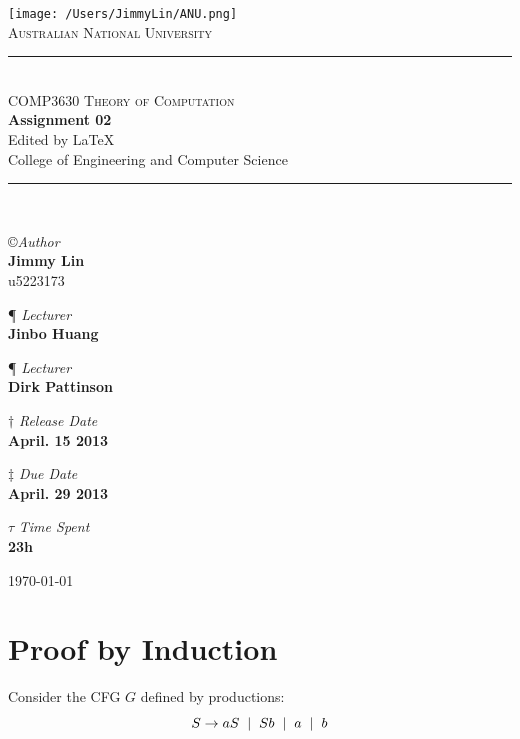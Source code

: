 \documentclass[11pt,a4paper]{article}
\newcommand{\AUTHOR}{Jimmy Lin}
\newcommand{\UID}{u5223173}
\newcommand{\UNIVERSITY}{Australian National University}
\newcommand{\COLLEGE}{College of Engineering and Computer Science}
\newcommand{\COURSE}{COMP3630 Theory of Computation}
\newcommand{\LECTURER}{Jinbo Huang}
\newcommand{\LECTURERt}{Dirk Pattinson}
\newcommand{\TASK}{Assignment 02}
\newcommand{\RELEASEDATE}{April. 15 2013}
\newcommand{\DUEDATE}{April. 29 2013}
\newcommand{\TIMECONSUME}{23h}
\newcommand{\htab}{\hspace*{0.63cm}}
\newcommand{\ba}{\hspace*{0.2cm} | \hspace*{0.2cm}}
\begin{document}
\begin{titlepage}
    \begin{center}
        \vspace*{0.8cm}
\texttt{[image: /Users/JimmyLin/ANU.png]}\\[1cm]
\textsc{\LARGE \UNIVERSITY}\\[1.5cm]

\rule{\linewidth}{0.5mm} \\[0.4cm]
{ \textsc{\Large \COURSE}\\[0.5cm]
 \huge \bfseries \TASK}\\[0.4cm]
 \footnotesize Edited by \LaTeX \\[0.25cm]
 \normalsize{\COLLEGE}
\rule{\linewidth}{0.5mm} \\[1.5cm]

\begin{center}
\copyright \emph{\large Author} \\
\Large \textbf{\AUTHOR} \\ \UID \vspace*{0.6cm}

\P \emph{ Lecturer} \\
\Large \textbf{\LECTURER} \vspace*{0.6cm}

\P \emph{ Lecturer} \\
\Large \textbf{\LECTURERt} \vspace*{0.6cm}


$\dagger$ \emph{Release Date}  \\
\Large \textbf{\RELEASEDATE} \vspace*{0.6cm} 

$\ddagger$ \emph{Due Date}  \\
\Large \textbf{\DUEDATE} \vspace*{0.6cm}

$\tau$ \emph{Time Spent} \\
\Large \textbf{\TIMECONSUME} \vspace*{0.6cm} 
\end{center}
\vfill
{\large \today}
\end{center}
\end{titlepage}

\begin{center} \tableofcontents \end{center}
 \newpage
 \section{Proof by Induction}
  \htab Consider the CFG $G$ defined by productions:
    $$ S \rightarrow aS \ba Sb \ba a \ba b $$
\end{document}
